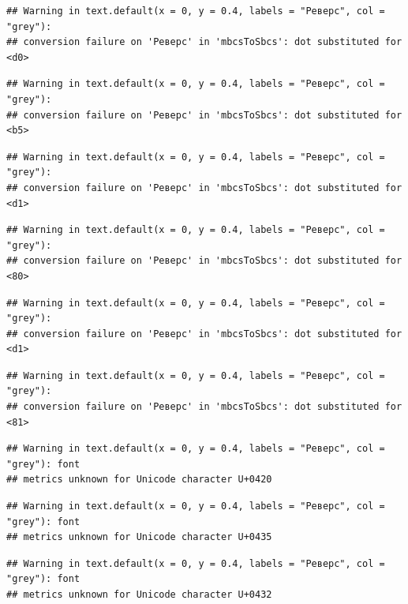 \documentclass[
  11pt,
]{book}
\begin{document}
\begin{verbatim}
## Warning in text.default(x = 0, y = 0.4, labels = "Реверс", col = "grey"):
## conversion failure on 'Реверс' in 'mbcsToSbcs': dot substituted for <d0>
\end{verbatim}

\begin{verbatim}
## Warning in text.default(x = 0, y = 0.4, labels = "Реверс", col = "grey"):
## conversion failure on 'Реверс' in 'mbcsToSbcs': dot substituted for <b5>
\end{verbatim}

\begin{verbatim}
## Warning in text.default(x = 0, y = 0.4, labels = "Реверс", col = "grey"):
## conversion failure on 'Реверс' in 'mbcsToSbcs': dot substituted for <d1>
\end{verbatim}

\begin{verbatim}
## Warning in text.default(x = 0, y = 0.4, labels = "Реверс", col = "grey"):
## conversion failure on 'Реверс' in 'mbcsToSbcs': dot substituted for <80>
\end{verbatim}

\begin{verbatim}
## Warning in text.default(x = 0, y = 0.4, labels = "Реверс", col = "grey"):
## conversion failure on 'Реверс' in 'mbcsToSbcs': dot substituted for <d1>
\end{verbatim}

\begin{verbatim}
## Warning in text.default(x = 0, y = 0.4, labels = "Реверс", col = "grey"):
## conversion failure on 'Реверс' in 'mbcsToSbcs': dot substituted for <81>
\end{verbatim}

\begin{verbatim}
## Warning in text.default(x = 0, y = 0.4, labels = "Реверс", col = "grey"): font
## metrics unknown for Unicode character U+0420
\end{verbatim}

\begin{verbatim}
## Warning in text.default(x = 0, y = 0.4, labels = "Реверс", col = "grey"): font
## metrics unknown for Unicode character U+0435
\end{verbatim}

\begin{verbatim}
## Warning in text.default(x = 0, y = 0.4, labels = "Реверс", col = "grey"): font
## metrics unknown for Unicode character U+0432
\end{verbatim}
\end{document}
